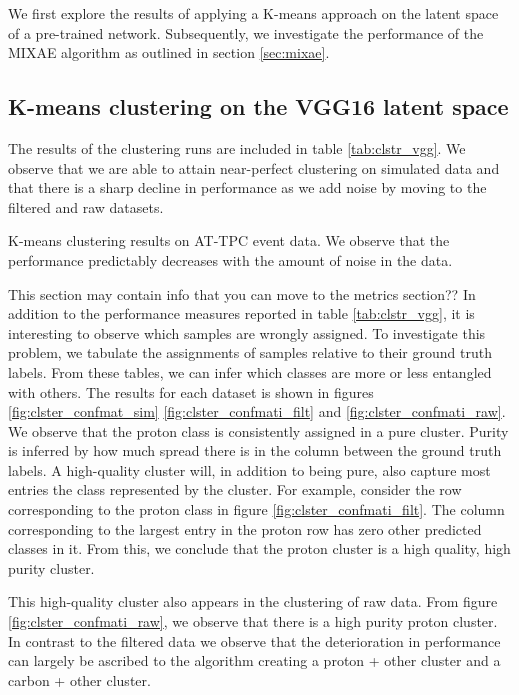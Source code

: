 \documentclass[review,number,sort&compress]{elsarticle}
\begin{document}
We first explore the results of applying a K-means approach on the latent space of a pre-trained network. Subsequently, we investigate the performance of the MIXAE algorithm as outlined in section \ref{sec:mixae}.

\subsection{K-means clustering on the VGG16 latent space}

The results of the clustering runs are included in table \ref{tab:clstr_vgg}. We observe that we are able to attain near-perfect clustering on simulated data and that there is a sharp decline in performance as we add noise by moving to the filtered and raw datasets. 


\begin{table}[H]
\centering 
\caption[K-means on pre-trained model]{K-means clustering results on AT-TPC event data. We observe that the performance predictably decreases with the amount of noise in the data.}\label{tab:clstr_vgg}

\end{table}

{\color{blue} This section may contain info that you can move to the metrics section??}
In addition to the performance measures reported in table \ref{tab:clstr_vgg}, it is interesting to observe which samples are wrongly assigned. To investigate this problem, we tabulate the assignments of samples relative to their ground truth labels. From these tables, we can infer which classes are more or less entangled with others. The results for each dataset is shown in figures \ref{fig:clster_confmat_sim} \ref{fig:clster_confmati_filt} and \ref{fig:clster_confmati_raw}. We observe that the proton class is consistently assigned in a pure cluster. Purity is inferred by how much spread there is in the column between the ground truth labels. A high-quality cluster will, in addition to being pure, also capture most entries the class represented by the cluster. For example, consider the row corresponding to the proton class in figure \ref{fig:clster_confmati_filt}. The column corresponding to the largest entry in the proton row has zero other predicted classes in it. From this, we conclude that the proton cluster is a high quality, high purity cluster. 

This high-quality cluster also appears in the clustering of raw data. From figure \ref{fig:clster_confmati_raw}, we observe that there is a high purity proton cluster. In contrast to the filtered data we observe that the deterioration in performance can largely be ascribed to the algorithm creating a proton + other cluster and a carbon + other cluster.
\end{document}
